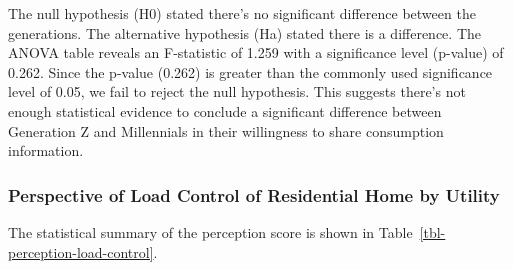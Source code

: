 \documentclass[
  letterpaper,
  DIV=11,
  numbers=noendperiod]{scrartcl}
\begin{document}
The null hypothesis (H0) stated there's no significant difference
between the generations. The alternative hypothesis (Ha) stated there is
a difference. The ANOVA table reveals an F-statistic of 1.259 with a
significance level (p-value) of 0.262. Since the p-value (0.262) is
greater than the commonly used significance level of 0.05, we fail to
reject the null hypothesis. This suggests there's not enough statistical
evidence to conclude a significant difference between Generation Z and
Millennials in their willingness to share consumption information.

\subsubsection{Perspective of Load Control of Residential Home by
Utility}\label{perspective-of-load-control-of-residential-home-by-utility}

The statistical summary of the perception score is shown in
Table~\ref{tbl-perception-load-control}.
\end{document}
